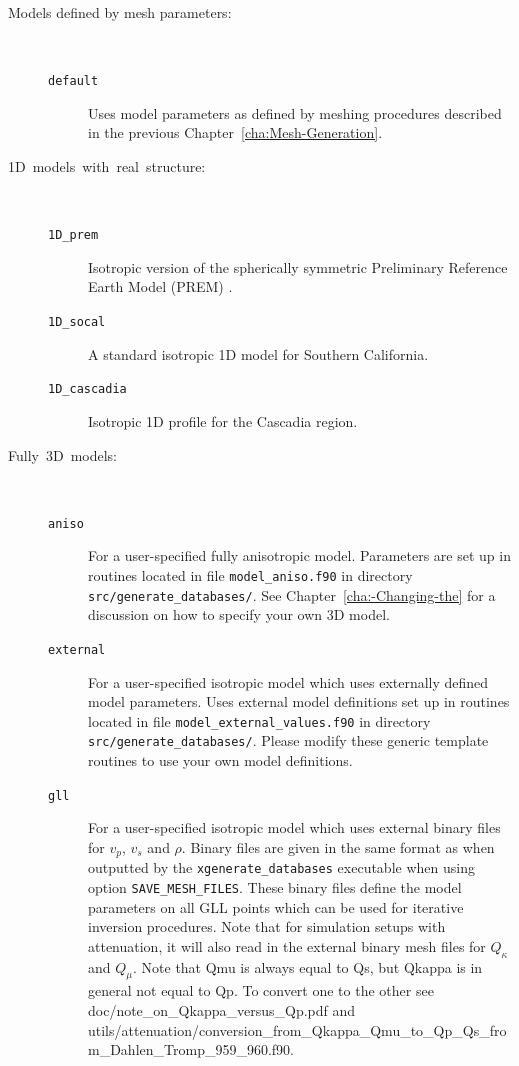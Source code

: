\begin{description}
\begin{description}
\item [{\textmd{Models defined by mesh parameters:}}] ~

\begin{description}
\item [{\texttt{default}}] Uses model parameters as defined by meshing
procedures described in the previous Chapter~\ref{cha:Mesh-Generation}.
\end{description}

\item [{\textmd{1D~models~with~real~structure:}}] ~

\begin{description}
\item [{\texttt{1D\_prem}}] Isotropic version of the spherically symmetric
Preliminary Reference Earth Model (PREM) \citep{DzAn81}.
\item [{\texttt{1D\_socal}}] A standard isotropic 1D model for Southern
California.
\item [{\texttt{1D\_cascadia}}] Isotropic 1D profile for the Cascadia region.
\end{description}

\item [{\textmd{Fully~3D~models:}}] ~

\begin{description}
\item [{\texttt{aniso}}] For a user-specified fully anisotropic model.
Parameters are set up in routines located in file \texttt{model\_aniso.f90}
in directory \texttt{src/generate\_databases/}. See Chapter~\ref{cha:-Changing-the}
for a discussion on how to specify your own 3D model.

\item [{\texttt{external}}] For a user-specified isotropic model which
uses externally defined model parameters. Uses external model definitions
set up in routines located in file \texttt{model\_external\_values.f90}
in directory \texttt{src/generate\_databases/}. Please modify these
generic template routines to use your own model definitions.

\item [{\texttt{gll}}] For a user-specified isotropic model which uses
external binary files for $v_{p}$, $v_{s}$ and $\rho$. Binary files
are given in the same format as when outputted by the \texttt{xgenerate\_databases}
executable when using option \texttt{SAVE\_MESH\_FILES}. These binary
files define the model parameters on all GLL points which can be used
for iterative inversion procedures. Note that for simulation setups with attenuation,
it will also read in the external binary mesh files for $Q_{\kappa}$ and $Q_{\mu}$.
Note that Qmu is always equal to Qs, but Qkappa is in general not equal to Qp. To convert one to the other see doc/note\_on\_Qkappa\_versus\_Qp.pdf and utils/attenuation/conversion\_from\_Qkappa\_Qmu\_to\_Qp\_Qs\_from\_Dahlen\_Tromp\_959\_960.f90.


\end{description}
\end{description}
\end{description}
